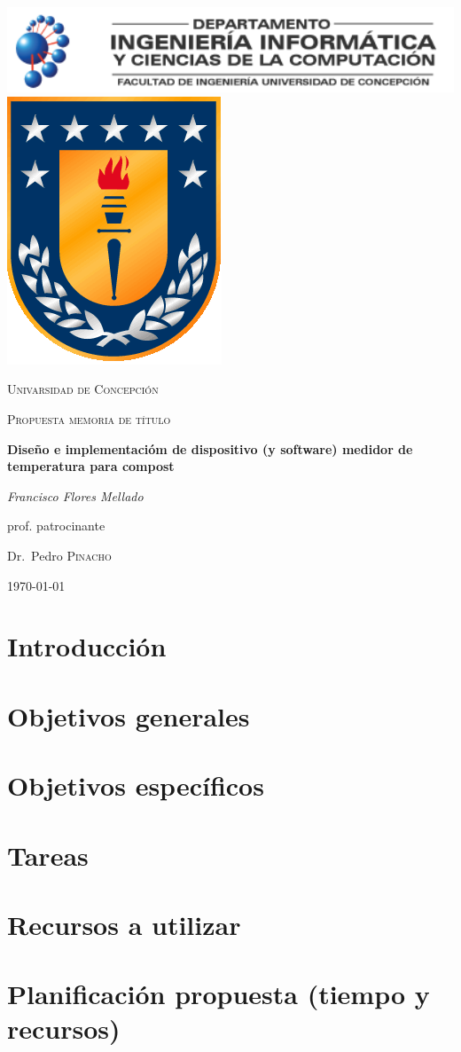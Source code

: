 \documentclass[12pt, letterpaper]{article}
\begin{document}
\begin{titlepage}
	\centering			
	\includegraphics[width=1\textwidth]{figures/logo_DIICC.png}
	\includegraphics[width=.1\textwidth]{figures/escudo_udec.png}
	\par\vspace{1cm}
	{\scshape\LARGE Univarsidad de Concepción \par}
	\vspace{1cm}
	{\scshape\Large Propuesta memoria de título\par}
	\vspace{1.5cm}
	{\huge\bfseries Diseño e implementacióm de dispositivo (y software) medidor de temperatura para compost\par}
	\vspace{2cm}
	{\Large\itshape Francisco Flores Mellado\par}
	\vfill
	prof. patrocinante\par
	Dr.~Pedro \textsc{Pinacho}

	\vfill

	{\large \today\par}
\end{titlepage}

\section{Introducción}


\section{Objetivos generales}

\section{Objetivos específicos}

\section{Tareas}

\section{Recursos a utilizar}

\section{Planificación propuesta (tiempo y recursos)}
\end{document}
